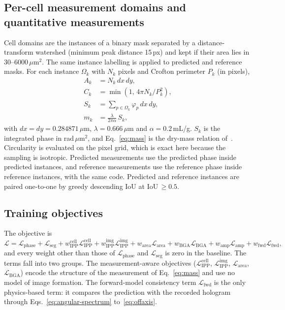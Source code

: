 \documentclass[11pt]{article}
\newcommand{\Lphase}{\mathcal{L}_\mathrm{phase}}
\newcommand{\Lseg}{\mathcal{L}_\mathrm{seg}}
\newcommand{\Lippc}{\mathcal{L}_\mathrm{IPP}^\mathrm{cell}}
\newcommand{\Lippi}{\mathcal{L}_\mathrm{IPP}^\mathrm{img}}
\newcommand{\Larea}{\mathcal{L}_\mathrm{area}}
\newcommand{\Lbga}{\mathcal{L}_\mathrm{BGA}}
\newcommand{\Lfwd}{\mathcal{L}_\mathrm{fwd}}
\newcommand{\Lamp}{\mathcal{L}_\mathrm{amp}}
\begin{document}
\subsection{Per-cell measurement domains and quantitative measurements}
\label{sec:measure}

Cell domains are the instances of a binary mask separated by a
distance-transform watershed (minimum peak distance 15\,px) and kept if their
area lies in 30--6000\,$\mu$m$^2$. The same instance labelling is applied to
predicted and reference masks. For each instance $\Omega_k$ with $N_k$ pixels
and Crofton perimeter $P_k$ (in pixels),
\begin{align}
A_k &= N_k\,dx\,dy , \label{eq:area}\\
C_k &= \min\!\left(1,\, 4\pi N_k / P_k^2\right) , \label{eq:circ}\\
S_k &= \textstyle\sum_{p\in\Omega_k}\varphi_p\,dx\,dy , \label{eq:volume}\\
m_k &= \frac{\lambda}{2\pi\alpha}\,S_k , \label{eq:mass}
\end{align}
with $dx=dy=0.284871\,\mu$m, $\lambda=0.666\,\mu$m and $\alpha=0.2$\,mL/g.
$S_k$ is the integrated phase in rad\,$\mu$m$^2$, and Eq.~\eqref{eq:mass} is the
dry-mass relation of~\cite{barer1952}. Circularity is evaluated on the pixel
grid, which is exact here because the sampling is isotropic. Predicted
measurements use the predicted phase inside predicted instances, and reference
measurements use the reference phase inside reference instances, with the same
code. Predicted and reference instances are paired one-to-one by greedy
descending IoU at IoU\,$\ge0.5$.

\subsection{Training objectives}
\label{sec:objective}

The objective is
\begin{equation}
\mathcal{L} = \Lphase + \Lseg
+ w_\mathrm{IPP}^\mathrm{cell}\Lippc + w_\mathrm{IPP}^\mathrm{img}\Lippi
+ w_\mathrm{area}\Larea
+ w_\mathrm{BGA}\Lbga
+ w_\mathrm{amp}\Lamp + w_\mathrm{fwd}\Lfwd ,
\label{eq:total}
\end{equation}
and every weight other than those of $\Lphase$ and $\Lseg$ is zero in the
baseline. The terms fall into two groups. The measurement-aware objectives
($\Lippc$, $\Lippi$, $\Larea$, $\Lbga$) encode the structure of the measurement
of Eq.~\eqref{eq:mass} and use no model of image formation. The forward-model
consistency term $\Lfwd$ is the only physics-based term: it compares the
prediction with the recorded hologram through Eqs.~\eqref{eq:angular-spectrum}
to~\eqref{eq:offaxis}.
\end{document}

